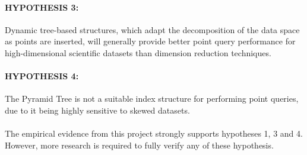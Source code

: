 \paragraph{\textbf{HYPOTHESIS 3:}} Dynamic tree-based structures, which adapt the decomposition of the data space as points are inserted, will generally provide better point query performance for high-dimensional scientific datasets than dimension reduction techniques.

\paragraph{\textbf{HYPOTHESIS 4:}} The Pyramid Tree is not a suitable index structure for performing point queries, due to it being highly sensitive to skewed datasets.

\paragraph{}

The empirical evidence from this project strongly supports hypotheses 1, 3 and 4. However, more research is required to fully verify any of these hypothesis.

